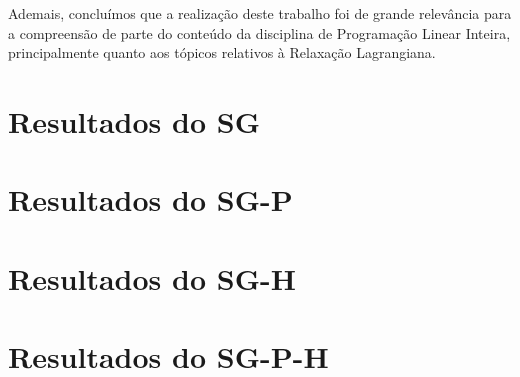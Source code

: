 \documentclass[12pt, a4paper]{article}
\theoremstyle{plain}
\theoremstyle{definition}
\theoremstyle{remark}
\begin{document}
Ademais, concluímos que a realização deste trabalho foi de grande relevância para a compreensão de parte do conteúdo da disciplina de Programação Linear Inteira, principalmente quanto aos tópicos relativos à Relaxação Lagrangiana.




\appendix
\newpage

\section{Resultados do SG}
\scriptsize

\newpage

\normalsize
\section{Resultados do SG-P}
\scriptsize

\newpage

\normalsize
\section{Resultados do SG-H}
\scriptsize

\newpage

\normalsize
\section{Resultados do SG-P-H}
\scriptsize

\end{document}
